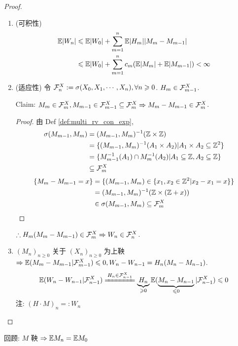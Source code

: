 \begin{proof}
    \begin{enumerate}
        \item (可积性)
        \[
        \begin{aligned}
            \mathbb E |W_n| &\leqslant \mathbb E |W_0|+\sum_{m=1}^n \mathbb E |H_m||M_m-M_{m-1}|\\
            &\leqslant \mathbb E |W_0|+\sum_{m=1}^n c_m (\mathbb E |M_m|+ \mathbb E |M_{m-1}|)<\infty
        \end{aligned}
        \]
        \item (适应性) 令 $\mathcal{F}_n^X:=\sigma(X_0,X_1,\cdots,X_n), \forall n\geqslant 0$. $H_m\in \mathcal{F}_{m-1}^X$.
        
        Claim: $M_m\in \mathcal{F}_m^X, M_{m-1}\in \mathcal{F}_{m-1}^X\subseteq \mathcal{F}_m^X \Rightarrow M_m-M_{m-1}\in \mathcal{F}_m^X$.
        \begin{proof}
        由 Def \ref{def:multi_rv_con_exp},
        \[
        \begin{aligned}
            \sigma(M_{m-1},M_m) &=(M_{m-1}, M_m)^{-1}(\mathbb{Z}\times \mathbb{Z})\\
            &=\{(M_{m-1}, M_m)^{-1}(A_1\times A_2)|A_1\times A_2\subseteq \mathbb{Z}^2\}\\
            &=\{M_{m-1}^{-1}(A_1)\cap M_m^{-1}(A_2)|A_1\subseteq \mathbb{Z}, A_2\subseteq \mathbb{Z}\}\\
            &\subseteq \mathcal{F}_m^X
        \end{aligned}
        \]
        \[
        \begin{aligned}
            \{M_m-M_{m-1}=x\} &=\{(M_{m-1}, M_m)\in \{x_1,x_2\in \mathbb{Z}^2|x_2-x_1=x\}\}\\
            &=(M_{m-1}, M_m)^{-1}(\mathbb{Z}\times (\mathbb{Z}+x))\\
            &\in \sigma(M_{m-1}, M_m)\subseteq \mathcal{F}_m^X
        \end{aligned}
        \]
        \end{proof}
        $\therefore H_m(M_m-M_{m-1})\in \mathcal{F}_m^X \Rightarrow W_n\in \mathcal{F}_n^X$.
        \item $(M_n)_{n\geq 0}$ 关于 $(X_n)_{n\geq 0}$ 为上鞅 $\Rightarrow \mathbb E(M_m-M_{m-1}|\mathcal{F}_{m-1}^X)\leqslant 0, W_n-W_{n-1}=H_n(M_n-M_{n-1})$.
        \[
        \EE(W_n-W_{n-1}|\CF_{n-1}^X)\xlongequal{H_n\in \CF_{n-1}^X}\underbrace{H_n}_{\geq 0}\EE(\underbrace{M_n-M_{n-1}}_{\leq 0}|\CF_{n-1}^X)\leq 0
        \]
        注: $(H\cdot M)_n=:W_n$
    \end{enumerate}
\end{proof}

回顾: $M$ 鞅 $\Rightarrow \mathbb E M_n=\mathbb E M_0$

